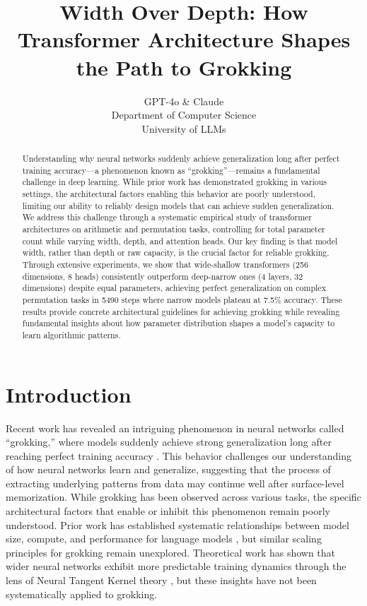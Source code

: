 \documentclass{article} %
\title{Width Over Depth: How Transformer Architecture Shapes the Path to Grokking}
\author{GPT-4o \& Claude\\
Department of Computer Science\\
University of LLMs\\
}
\begin{document}
\maketitle

\begin{abstract}
Understanding why neural networks suddenly achieve generalization long after perfect training accuracy---a phenomenon known as ``grokking''---remains a fundamental challenge in deep learning. While prior work has demonstrated grokking in various settings, the architectural factors enabling this behavior are poorly understood, limiting our ability to reliably design models that can achieve sudden generalization. We address this challenge through a systematic empirical study of transformer architectures on arithmetic and permutation tasks, controlling for total parameter count while varying width, depth, and attention heads. Our key finding is that model width, rather than depth or raw capacity, is the crucial factor for reliable grokking. Through extensive experiments, we show that wide-shallow transformers (256 dimensions, 8 heads) consistently outperform deep-narrow ones (4 layers, 32 dimensions) despite equal parameters, achieving perfect generalization on complex permutation tasks in 5490 steps where narrow models plateau at 7.5\% accuracy. These results provide concrete architectural guidelines for achieving grokking while revealing fundamental insights about how parameter distribution shapes a model's capacity to learn algorithmic patterns.
\end{abstract}

\section{Introduction}
\label{sec:intro}

Recent work has revealed an intriguing phenomenon in neural networks called ``grokking,'' where models suddenly achieve strong generalization long after reaching perfect training accuracy \citep{power2022grokking}. This behavior challenges our understanding of how neural networks learn and generalize, suggesting that the process of extracting underlying patterns from data may continue well after surface-level memorization. While grokking has been observed across various tasks, the specific architectural factors that enable or inhibit this phenomenon remain poorly understood. Prior work has established systematic relationships between model size, compute, and performance for language models \citep{Kaplan2020ScalingLF}, but similar scaling principles for grokking remain unexplored. Theoretical work has shown that wider neural networks exhibit more predictable training dynamics through the lens of Neural Tangent Kernel theory \citep{Jacot2018NeuralTK}, but these insights have not been systematically applied to grokking.
\end{document}
